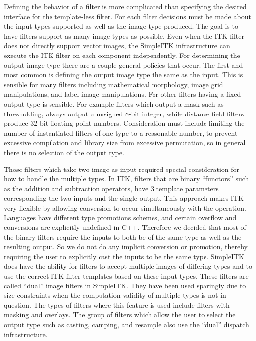 \documentclass{frontiersMED} %
\begin{document}
Defining the behavior of a filter is more complicated than specifying
the desired interface for the template-less filter. For each filter
decisions must be made about the input types supported as well as the
image type produced. The goal is to have filters support as many image
types as possible. Even when the ITK filter does not directly support
vector images, the SimpleITK infrastructure can execute the ITK filter
on each component independently. For determining the output image type
there are a couple general policies that occur. The first and most
common is defining the output image type the same as the input. This
is sensible for many filters including mathematical morphology, image
grid manipulations, and label image manipulations. For other filters
having a fixed output type is sensible. For example filters which
output a mask such as thresholding, always output a unsigned 8-bit
integer, while distance field filters produce 32-bit floating point
numbers. Consideration must include limiting the number of
instantiated filters of one type to a reasonable number, to prevent
excessive compilation and library size from excessive permutation, so
in general there is no selection of the output type.

Those filters which take two image as input required special
consideration for how to handle the multiple types. In ITK, filters
that are binary “functors” such as the addition and subtraction
operators, have 3 template parameters corresponding the two inputs and
the single output. This approach makes ITK very flexible by allowing
conversion to occur simultaneously with the operation. Languages have
different type promotions schemes, and certain overflow and
conversions are explicitly undefined in C++. Therefore we decided that
most of the binary filters require the inputs to both be of the same
type as well as the resulting output. So we do not do any implicit
conversion or promotion, thereby requiring the user to explicitly cast
the inputs to be the same type. SimpleITK does have the ability for
filters to accept multiple images of differing types and to use the
correct ITK filter templates based on these input types. These filters
are called “dual” image filters in SimpleITK. They have been used
sparingly due to size constraints when the computation validity of
multiple types is not in question.  The types of filters where this
feature is used include filters with masking and overlays. The group
of filters which allow the user to select the output type such as
casting, camping, and resample also use the “dual” dispatch
infrastructure.
\end{document}
